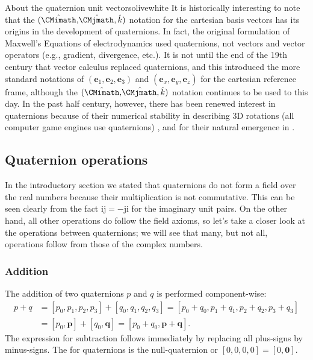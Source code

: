 \begin{messagebox}{About the quaternion unit vectors}{olive}{\icinfo}{white}
It is historically interesting to note that the  $(\hat{\CMimath}, \hat{\mkern-3mu\CMjmath}, \hat{k})$ notation for the cartesian basis vectors has its origins in the development of quaternions.  In fact, the original formulation of Maxwell's Equations of electrodynamics used quaternions, not vectors and vector operators (e.g., gradient, divergence, etc.).  It is not until the end of the 19th century that vector calculus replaced quaternions, and this introduced the more standard notations of $(\mathbf{e}_1,\mathbf{e}_2,\mathbf{e}_3)$ and  $(\mathbf{e}_x,\mathbf{e}_y,\mathbf{e}_z)$ for the cartesian reference frame, although the $(\hat{\CMimath}, \hat{\mkern-3mu\CMjmath}, \hat{k})$ notation continues to be used to this day.  In the past half century, however, there has been renewed interest in quaternions because of their numerical stability  in describing 3D rotations (all computer game engines use quaternions) \cite{xxx}, and for their natural emergence in  \cite{xxx}.
\end{messagebox}


\subsection{Quaternion operations}
In the introductory section we stated that quaternions do not form a field over the real numbers because their multiplication is not commutative.  This can be seen clearly from the fact $\mathrm{i}\mathrm{j}=-\mathrm{j}\mathrm{i}$ for the imaginary unit pairs.  On the other hand, all other operations do follow the field axioms, so let's take a closer look at the operations between quaternions; we will see that many, but not all, operations follow from those of the complex numbers.

\subsubsection{Addition}
The addition of two quaternions $p$ and $q$ is performed component-wise:
\begin{equation}
\begin{split}
	p+q &= [p_0,p_1,p_2,p_3]+[q_0,q_1,q_2,q_3]=[p_0+q_0,p_1+q_1,p_2+q_2,p_3+q_3]\\
	 &= [p_0,\mathbf{p}]+[q_0,\mathbf{q}]= [p_0+q_0,\mathbf{p}+\mathbf{q}].
\end{split}
\end{equation}
The expression for subtraction follows immediately by replacing all plus-signs by minus-signs.  The  for quaternions is the null-quaternion or $[0,0,0,0]=[0,\mathbf{0}]$.

